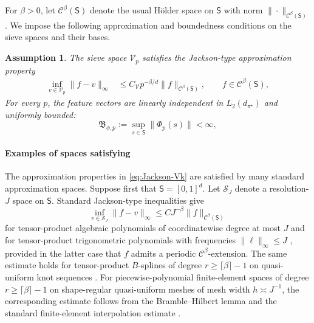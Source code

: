 \documentclass{article}
\theoremstyle{definition}
\theoremstyle{remark}
\theoremstyle{plain}
\newtheorem{assumption}[proposition]{Assumption}
\newcommand{\dsieve}{p}
\numberwithin{equation}{section}
\begin{document}
For \(\beta>0\), let
\(\mathcal C^\beta(\mathsf S)\) denote the usual Hölder space on
\(\mathsf S\) with norm \(\|\cdot\|_{\mathcal{C}^\beta(\mathsf{S})}\). 
We impose the following approximation and boundedness conditions on the sieve spaces and their bases.
\begin{assumption}
\label{assum:kernel_approximation}
    The sieve space \(\mathcal V_\dsieve\) satisfies the Jackson-type approximation property
    \begin{align}
    \label{eq:Jackson-Vk}
       \inf_{v\in\mathcal{V}_\dsieve} \|f - v\|_{\infty}
        &\leq
        C_{\mathcal V}
        \dsieve^{-\beta/d}
        \|f\|_{\mathcal C^\beta(\mathsf S)},
        \qquad f\in\mathcal C^\beta(\mathsf S),
    \end{align}
    For every \(\dsieve\), the feature vectors are linearly independent in \(L_2(d_{\pi^\star})\) and  uniformly
    bounded:
    \begin{equation}
    \label{eq:bounded-features}
        \mathfrak B_{\phi,\dsieve}
        :=
        \sup_{s\in\mathsf S}
        \|\Phi_{\dsieve}(s)\|
        <\infty,
    \end{equation}
\end{assumption}

\paragraph{Examples of spaces satisfying }
The approximation properties in \eqref{eq:Jackson-Vk} are satisfied by
many standard approximation spaces. Suppose first that
\(\mathsf S=[0,1]^d\). Let \(\mathcal S_J\) denote a resolution-\(J\)
space on \(\mathsf S\). Standard Jackson-type inequalities give
\begin{equation}
\label{eq:examples-Jackson-resolution}
    \inf_{v\in\mathcal S_J}
    \|f-v\|_{\infty}
    \leq
    C J^{-\beta}
    \|f\|_{\mathcal C^\beta(\mathsf S)}
\end{equation}
for tensor-product algebraic polynomials of coordinatewise degree at
most \(J\)
\cite[Ch.~7, Theorem~6.1]{devoreLorentz1993constructive}
and for tensor-product trigonometric polynomials with frequencies
\(\|\ell\|_\infty\leq J\)
\cite[Ch.~7, Theorem~2.1]{devoreLorentz1993constructive},
provided in the latter case that \(f\) admits a periodic
\(\mathcal C^\beta\)-extension. The same estimate holds for tensor-product
\(B\)-splines of degree \(r\geq \lceil\beta\rceil-1\) on quasi-uniform
knot sequences
\cite[Ch.~6, Corollary~6.21 and Theorem~6.27]{schumaker2007spline}
\cite[Ch.~12, Theorems~12.7--12.8]{schumaker2007spline}.
For piecewise-polynomial finite-element spaces of degree
\(r\geq \lceil\beta\rceil-1\) on shape-regular quasi-uniform meshes of
mesh width \(h\asymp J^{-1}\), the corresponding estimate follows from
the Bramble--Hilbert lemma and the standard finite-element interpolation
estimate
\cite[Theorem~3.1.6]{ciarlet1978finite}
\cite[Ch.~4, Theorem~4.4.20]{brennerScott2008finite}.
\end{document}
